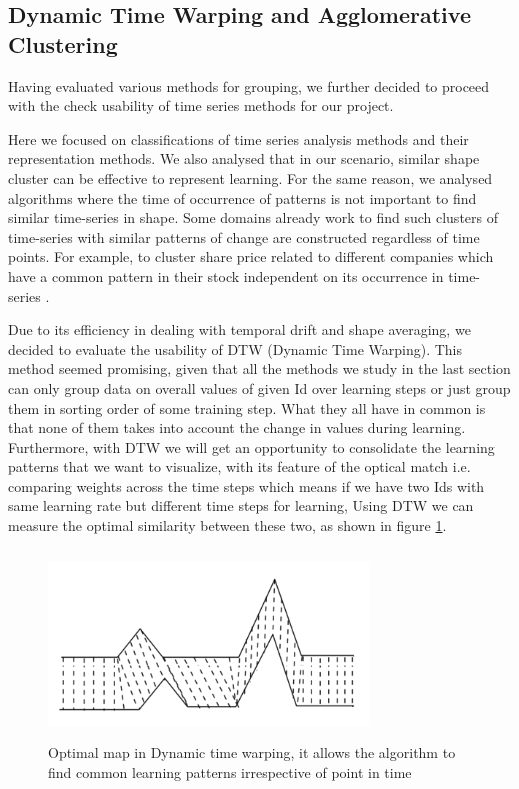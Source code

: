 \documentclass[journal]{vgtc}                %
\begin{document}
\subsection {Dynamic Time Warping and Agglomerative Clustering }
Having evaluated various methods for grouping, we further decided to proceed with the check usability of time series methods \cite{dtw_paper} for our project.

Here we focused on classifications of time series analysis methods and their representation methods.
We also analysed that in our scenario, similar shape cluster can be effective to represent learning.
 For the same reason, we analysed algorithms where the time of occurrence of patterns is not important to
find similar time-series in shape\cite{dynamicmuller2007}. Some domains already work to find such 
clusters of time-series with similar patterns of change are
constructed regardless of time points. For example, to
cluster share price related to different companies which
have a common pattern in their stock independent on its
occurrence in time-series \cite{dtw_paper} \cite{dtw_share}.

Due to its efficiency in dealing with temporal drift and shape averaging, we decided to evaluate the usability of DTW (Dynamic Time Warping). This method seemed promising, given that all the methods we study in the last section can only group data on overall values of given Id over learning steps or just group them in sorting order of some training step. What they all have in common is that none of them takes into account the change in values during learning.
Furthermore, with DTW we will get an opportunity to consolidate the learning patterns that we want to visualize,
with its feature of the optical match i.e. comparing weights across the time steps which means if we have two Ids with same learning rate but different time steps for learning, Using DTW we can measure the optimal similarity between these two, as shown in figure \ref{fig:dtwl}.
 
 \begin{figure}
    \includegraphics[width=8.5cm,height=5cm] {Dynamic_time_warping.png}
    \caption{Optimal map in Dynamic time warping, it allows the algorithm to
    find common learning patterns irrespective of point in time \cite{dtw_wiki}}
    \label{fig:dtwl}
\end{figure}
\end{document}
